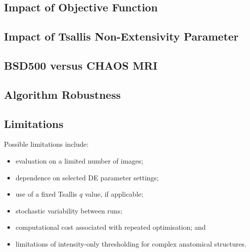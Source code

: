 \documentclass[review]{elsarticle}
\begin{document}
\subsection{Impact of Objective Function}



\subsection{Impact of Tsallis Non-Extensivity Parameter}

%


\subsection{BSD500 versus CHAOS MRI}



\subsection{Algorithm Robustness}



\subsection{Limitations}

Possible limitations include:

\begin{itemize}
    \item evaluation on a limited number of images;
    \item dependence on selected DE parameter settings;
    \item use of a fixed Tsallis $q$ value, if applicable;
    \item stochastic variability between runs;
    \item computational cost associated with repeated optimisation; and
    \item limitations of intensity-only thresholding for complex
          anatomical structures.
\end{itemize}
\end{document}
